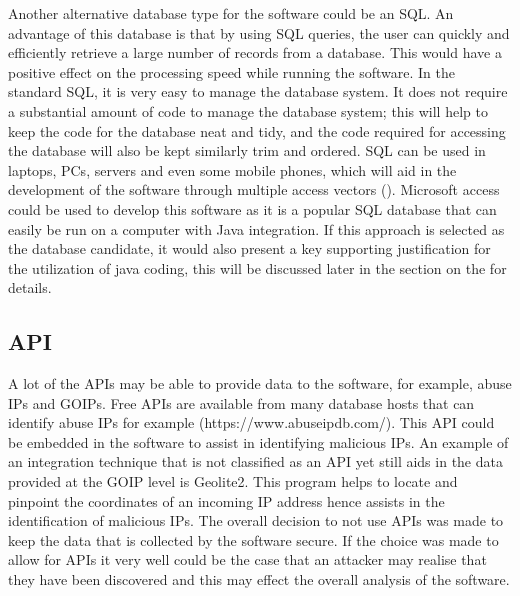 Another alternative database type for the software could be an SQL. An advantage of this database is that by using SQL queries, the user can quickly and efficiently retrieve a large number of records from a database. This would have a positive effect on the processing speed while running the software. In the standard SQL, it is very easy to manage the database system. It does not require a substantial amount of code to manage the database system; this will help to keep the code for the database neat and tidy, and the code required for accessing the database will also be kept similarly trim and ordered. SQL can be used in laptops, PCs, servers and even some mobile phones, which will aid in the development of the software through multiple access vectors (\cite{JavaTPoint}). Microsoft access could be used to develop this software as it is a popular SQL database that can easily be run on a computer with Java integration. If this approach is selected as the database candidate, it would also present a key supporting justification for the utilization of java coding, this will be discussed later in the section on the  for details.  


\subsection*{API }
A lot of the APIs may be able to provide data to the software, for example, abuse IPs and GOIPs. Free APIs are available from many database hosts that can identify abuse IPs for example (https://www.abuseipdb.com/). This API could be embedded in the software to assist in identifying malicious IPs. An example of an integration technique that is not classified as an API yet still aids in the data provided at the GOIP level is Geolite2. This program helps to locate and pinpoint the coordinates of an incoming IP address hence assists in the identification of malicious IPs. The overall decision to not use APIs was made to keep the data that is collected by the software secure. If the choice was made to allow for APIs it very well could be the case that an attacker may realise that they have been discovered and this may effect the overall analysis of the software.


